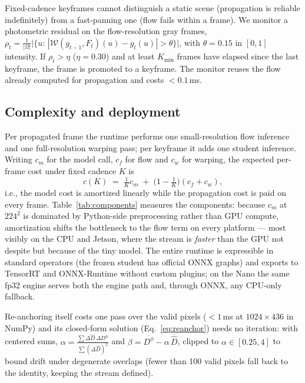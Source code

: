 \documentclass[10pt,twocolumn]{article}
\begin{document}
Fixed-cadence keyframes cannot distinguish a static scene (propagation is
reliable indefinitely) from a fast-panning one (flow fails within a frame).
We monitor a photometric residual on the flow-resolution gray frames,
$\rho_t = \frac{1}{|{\Omega}|}\big|\{u:\, |\mathcal{W}(g_{t-1}, F_t)(u) -
g_t(u)| > \theta\}\big|$, with $\theta{=}0.15$ in $[0,1]$ intensity. If
$\rho_t > \eta$ ($\eta{=}0.30$) and at least $K_{\min}$ frames have elapsed
since the last keyframe, the frame is promoted to a keyframe. The monitor
reuses the flow already computed for propagation and costs $<0.1$\,ms.

\subsection{Complexity and deployment}
\label{sec:complexity}
Per propagated frame the runtime performs one small-resolution flow inference
and one full-resolution warping pass; per keyframe it adds one student
inference. Writing $c_m$ for the model call, $c_f$ for flow and $c_w$ for
warping, the expected per-frame cost under fixed cadence $K$ is
\begin{equation}
  c(K) \;=\; \tfrac{1}{K}c_m \;+\; \big(1 - \tfrac{1}{K}\big)(c_f + c_w),
  \label{eq:cost}
\end{equation}
i.e., the model cost is amortized linearly while the propagation cost is
paid on every frame. Table~\ref{tab:components} measures the components:
because $c_m$ at $224^2$ is dominated by Python-side preprocessing rather
than GPU compute, amortization shifts the bottleneck to the flow term on
every platform --- most visibly on the CPU and Jetson, where the stream is
\emph{faster} than the GPU not despite but because of the tiny model. The
entire runtime is expressible in standard operators (the frozen student has
official ONNX graphs) and exports to TensorRT and ONNX-Runtime without
custom plugins; on the Nano the same fp32 engine serves both the engine
path and, through ONNX, any CPU-only fallback.

Re-anchoring itself costs one pass over the valid pixels ($<1$\,ms at
$1024{\times}436$ in NumPy) and its closed-form solution
(Eq.~\ref{eq:reanchor}) needs no iteration: with centered sums,
$\alpha = \tfrac{\sum \Delta\hat{D}\,\Delta D^{\phi}}{\sum (\Delta\hat{D})^2}$
and $\beta = \overline{D^{\phi}} - \alpha\,\overline{\hat{D}}$, clipped to
$\alpha \in [0.25, 4]$ to bound drift under degenerate overlaps (fewer than
100 valid pixels fall back to the identity, keeping the stream defined).
\end{document}
